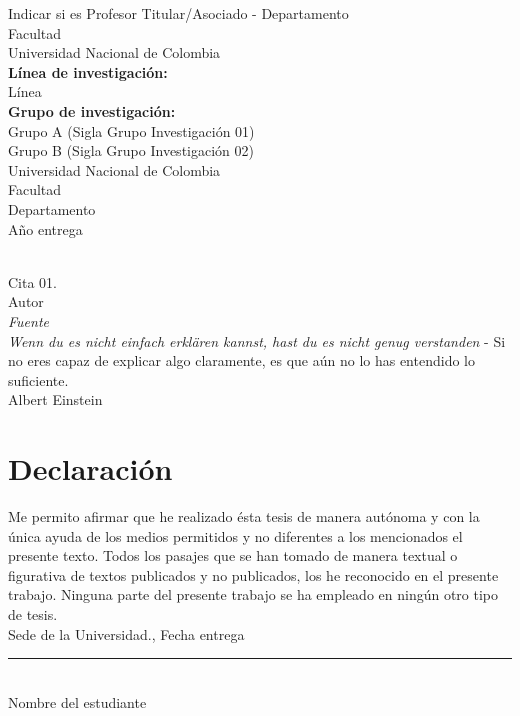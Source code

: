 \documentclass[10pt,spanish,fleqn,openany,twoside,letterpaper]{book}
\newcommand{\studentname}{}
\newcommand{\submissiondate}{}
\newcommand{\resgroupone}{}
\newcommand{\resgrouptwo}{}
\newcommand{\researchtopic}{}
\newcommand{\codirectortitle}{} %
\newcommand{\issuedate}{}
\newcommand{\sede}{}
\newcommand{\department}{}
\newcommand{\faculty}{}
\newcommand{\university}{Universidad Nacional de Colombia}
\renewcommand{\studentname}{Nombre del estudiante}
\renewcommand{\issuedate}{Año entrega}
\renewcommand{\submissiondate}{Fecha entrega}
\renewcommand{\codirectortitle}{Indicar si es Profesor Titular/Asociado}
\renewcommand{\resgroupone}{Grupo A (Sigla Grupo Investigación 01) }
\renewcommand{\resgrouptwo}{Grupo B (Sigla Grupo Investigación 02) }
\renewcommand{\researchtopic}{Línea}
\renewcommand{\sede}{Sede de la Universidad}
\renewcommand{\department}{Departamento}
\renewcommand{\faculty}{Facultad}
\begin{document}
{\begin{center}
\codirectortitle \; - \department \\
\faculty \\
\university 
\vspace{1.5cm} \\
\textbf{Línea de investigación:} \\ 
\researchtopic\\
\textbf{Grupo de investigación:} \\
\resgroupone \\
\resgrouptwo \\
\vspace{1.5cm} 
\university \\
\faculty \\
\department \\
\issuedate
\end{center}

\newpage
\thispagestyle{empty}
\begin{flushright}
\begin{minipage}{12.5cm}
\noindent
\\[10em]
{\Large Cita 01.}
\\[3em]
Autor
\\ \textit{Fuente}
\\[10em]
{\Large \textit{Wenn du es nicht einfach erkl\"{a}ren kannst, hast du es nicht genug verstanden} - Si no eres capaz de explicar algo claramente, es que aún no lo has entendido lo suficiente.}
\\[3em]
Albert Einstein
\end{minipage}
\end{flushright} 

\newpage
\chapter*{\sffamily Declaración}
\par Me permito afirmar que he realizado ésta tesis de manera autónoma y con la única ayuda de los medios permitidos y no diferentes a los mencionados el presente texto. Todos los pasajes que se han tomado de manera textual o figurativa de textos publicados y no publicados, los he reconocido en el presente trabajo. Ninguna parte del presente trabajo se ha empleado en ningún otro tipo de tesis. 
\\[1em]
\sede., \submissiondate
\\[6em]
\rule{6cm}{0.5pt}\\
\studentname
}
\end{document}
